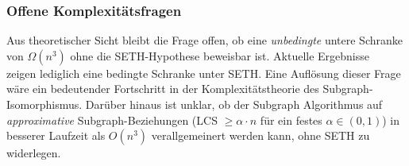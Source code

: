 ﻿\documentclass[a4paper,12pt]{article}
\theoremstyle{definition}
\begin{document}
\subsubsection{Offene Komplexitätsfragen}

Aus theoretischer Sicht bleibt die Frage offen, ob eine \emph{unbedingte}
untere Schranke von $\Omega(n^3)$ ohne die SETH-Hypothese beweisbar ist.
Aktuelle Ergebnisse~\cite{abboud2015tight} zeigen lediglich eine bedingte
Schranke unter SETH. Eine Auflösung dieser Frage wäre ein bedeutender
Fortschritt in der Komplexitätstheorie des Subgraph-Isomorphismus.
Darüber hinaus ist unklar, ob der Subgraph Algorithmus auf
\emph{approximative} Subgraph-Beziehungen (LCS $\geq \alpha \cdot n$ für
ein festes $\alpha \in (0, 1)$) in besserer Laufzeit als $O(n^3)$
verallgemeinert werden kann, ohne SETH zu widerlegen.
\end{document}
